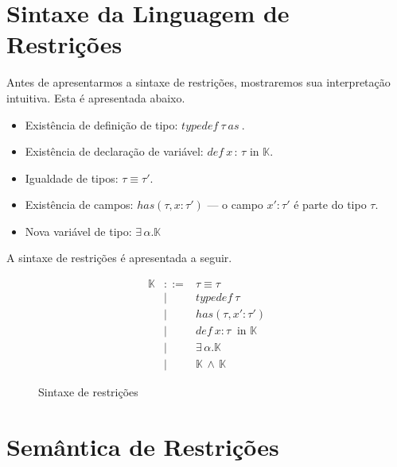 \documentclass[a4paper,8pt]{article}
\begin{document}
     \section{Sintaxe da Linguagem de Restrições}\label{constraintsyn}

     Antes de apresentarmos a sintaxe de restrições, mostraremos sua
     interpretação intuitiva. Esta é apresentada abaixo.

       \begin{itemize}
           \item Existência de definição de tipo: $typedef\:\tau\:as\:$.
           \item Existência de declaração de variável:
             $def\:x\,:\,\tau \text{ in } \mathbb{K}$.
           \item Igualdade de tipos: $\tau \equiv \tau'$.
	   \item Existência de campos: $has(\tau,x:\tau')$ --- o campo $x'
             : \tau'$ é parte do tipo $\tau$.
           \item Nova variável de tipo: $\exists \,\alpha. \mathbb{K}$
       \end{itemize}

     A sintaxe de restrições é apresentada a seguir. 

     \begin{figure}[h]
        \[
             \begin{array}{lcl}
                 \mathbb{K} & ::= & \tau \equiv \tau \\
                                    & \mid & typedef\:\tau \\
                                    & \mid & has(\tau, x' : \tau') \\
                                    & \mid & def\:x:\tau\:\text{ in
                                             }\mathbb{K}\\
                                    & \mid &
                                             \exists\,\alpha.\mathbb{K}\\
                                    & \mid & \mathbb{K}\,\land\,\mathbb{K}
             \end{array}
        \]
        \centering
        \caption{Sintaxe de restrições}
        \label{figconstrsyn}
      \end{figure}

     \section{Semântica de Restrições}\label{semantics}
\end{document}
